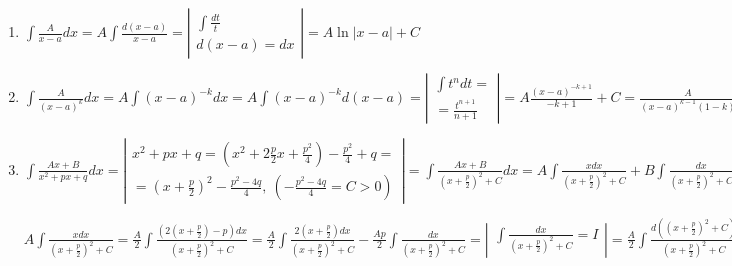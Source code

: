 \documentclass{report}
\theoremstyle{definition}
\begin{document}
\begin{enumerate}
    \item \(\int \frac{A}{x - a} dx = A \int \frac{d(x-a)}{x-a} =
          \left|
          \begin{array}{c}
              \int \frac{dt}{t} \\
              d(x-a) = dx
          \end{array}
          \right| = A \ln |x - a| + C\)
    \item \(\int \frac{A}{(x-a)^{k}} dx = A \int (x - a)^{-k} dx = A \int (x-a)^{-k} d(x-a) =
          \left|
          \begin{array}{c}
              \int t^{n}dt = \\
              = \frac{t^{n+1}}{n+1}
          \end{array}
          \right| = A \frac{(x-a)^{-k + 1}}{-k + 1} + C = \frac{A}{(x-a)^{k-1}(1-k)} + C\)

    \item \(\int \frac{Ax + B}{x^{2} + px + q} dx =
          \left|
          \begin{array}{c}
              x^{2} + px + q = (x^{2} + 2\frac{p}{2}x + \frac{p^{2}}{4}) - \frac{p^{2}}{4} + q = \\
              = (x + \frac{p}{2})^{2} - \frac{p^{2} - 4q}{4}, \ (- \frac{p^{2} - 4q}{4} = C > 0)
          \end{array}
          \right| = \int \frac{Ax + B}{(x + \frac{p}{2})^{2} + C} dx = A \int \frac{x dx}{(x + \frac{p}{2})^{2}
              + C} + B \int \frac{dx}{(x + \frac{p}{2})^{2} + C} =
          \left|
          \begin{array}{c}
              d((x + \frac{p}{2})^{2} + C) = \\
              = 2(x + \frac{p}{2} dx)
          \end{array}
          \right| = \ldots\) \\

          \begin{center}
              \begin{minipage}{8cm}
                  \setlength{\parindent}{0em}
                  \(A \int \frac{x dx}{(x + \frac{p}{2})^{2} + C} = \frac{A}{2} \int \frac{(2(x + \frac{p}{2})-p)dx}
                  {(x + \frac{p}{2})^{2} + C} = \frac{A}{2} \int \frac{2(x + \frac{p}{2})dx}{(x + \frac{p}{2})^{2} + C} -
                  \frac{Ap}{2} \int \frac{dx}{(x + \frac{p}{2})^{2} + C} =
                  \left|
                  \begin{array}{c}
                      \int \frac{dx}{(x + \frac{p}{2})^{2} + C} = I
                  \end{array}
                  \right| = \frac{A}{2} \int \frac{d((x + \frac{p}{2})^{2} + C)}{(x + \frac{p}{2})^{2} + C} -
                  \frac{Ap}{2} I = \frac{A}{2} \ln |(x + \frac{p}{2})^{2} + C| - \frac{Ap}{2}I;\) \\


\end{minipage}
\end{center}
\end{enumerate}
\end{document}
